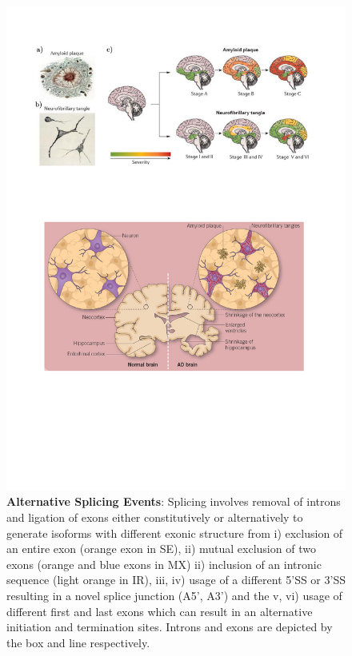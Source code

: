 \begin{figure}[!h]
	\centering
	\includegraphics[page=9,trim={0 16.5cm 0cm 0},clip, scale = 0.7]{Figures/Introduction_Figures.pdf}
	\captionsetup{width=0.95\textwidth,singlelinecheck=off}
	\caption[Alternative Splicing Events]%
	{\textbf{Alternative Splicing Events}: Splicing involves removal of introns and ligation of exons either constitutively or alternatively to generate isoforms with different exonic structure from i) exclusion of an entire exon (orange exon in SE), ii) mutual exclusion of two exons (orange and blue exons in MX) ii) inclusion of an intronic sequence (light orange in IR), iii, iv) usage of a different 5'SS or 3'SS resulting in a novel splice junction (A5', A3') and the v, vi) usage of different first and last exons which can result in an alternative initiation and termination sites. Introns and exons are depicted by the box and line respectively. 
	}
	\label{fig:AS_events}
\end{figure}

